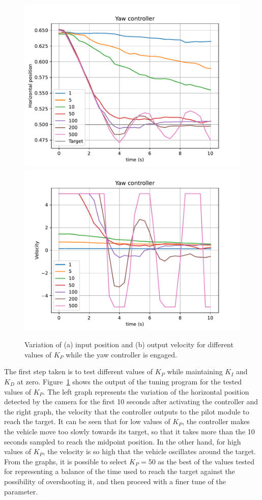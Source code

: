 \begin{figure}
  \centering
  \includegraphics[width=.45\linewidth]{img/4.1-tune/yaw_p1_feedback.pdf}
  \includegraphics[width=.45\linewidth]{img/4.1-tune/yaw_p1_speed.pdf}
  \caption{Variation of (a) input position and (b) output velocity for different values of $K_{P}$ while the yaw controller is engaged.}\label{fig:tune-yaw-prop}
\end{figure}


The first step taken is to test different values of $K_{P}$ while maintaining $K_{I}$ and $K_{D}$ at zero.
Figure~\ref{fig:tune-yaw-prop} shows the output of the tuning program for the tested values of $K_{P}$.
The left graph represents the variation of the horizontal position detected by the camera for the first 10 seconds after activating the controller and the right graph, the velocity that the controller outputs to the pilot module to reach the target.
It can be seen that for low values of $K_{P}$, the controller makes the vehicle move too slowly towards its target, so that it takes more than the 10 seconds sampled to reach the midpoint position.
In the other hand, for high values of $K_{P}$, the velocity is so high that the vehicle oscillates around the target.
From the graphs, it is possible to select $K_{P}=50$ as the best of the values tested for representing a balance of the time used to reach the target against the possibility of overshooting it, and then proceed with a finer tune of the parameter.

